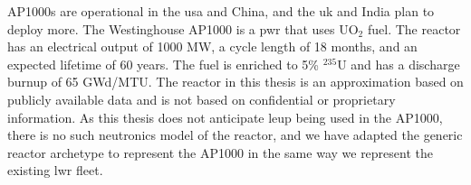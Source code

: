 AP1000s are operational in the \gls{usa} and China, and the \gls{uk} and India plan to deploy more. The Westinghouse AP1000 is a \gls{pwr} that uses UO$_2$ fuel. The reactor has an electrical output of 1000 MW, a cycle length of 18 months, and an expected lifetime of 60 years. The fuel is enriched to 5\% $^{235}$U and has a discharge burnup of 65 GWd/MTU. The reactor in this thesis is an approximation based on publicly available data and is not based on confidential or proprietary information. As this thesis does not anticipate \gls{leup} being used in the AP1000, there is no such neutronics model of the reactor, and we have adapted the generic \cycamore reactor archetype to represent the AP1000 in the same way we represent the existing \gls{lwr} fleet.
